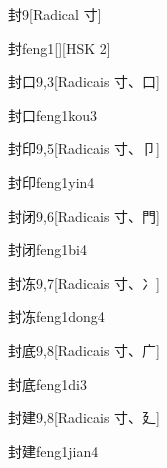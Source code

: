 \begin{entry}{封}{9}[Radical ⼨]
  \begin{phonetics}{封}{feng1}[][HSK 2]
  \end{phonetics}
\end{entry}

\begin{entry}{封口}{9,3}[Radicais ⼨、⼝]
  \begin{phonetics}{封口}{feng1kou3}
  \end{phonetics}
\end{entry}

\begin{entry}{封印}{9,5}[Radicais ⼨、⼙]
  \begin{phonetics}{封印}{feng1yin4}
  \end{phonetics}
\end{entry}

\begin{entry}{封闭}{9,6}[Radicais ⼨、⾨]
  \begin{phonetics}{封闭}{feng1bi4}
  \end{phonetics}
\end{entry}

\begin{entry}{封冻}{9,7}[Radicais ⼨、⼎]
  \begin{phonetics}{封冻}{feng1dong4}
  \end{phonetics}
\end{entry}

\begin{entry}{封底}{9,8}[Radicais ⼨、⼴]
  \begin{phonetics}{封底}{feng1di3}
  \end{phonetics}
\end{entry}

\begin{entry}{封建}{9,8}[Radicais ⼨、⼵]
  \begin{phonetics}{封建}{feng1jian4}
  \end{phonetics}
\end{entry}

